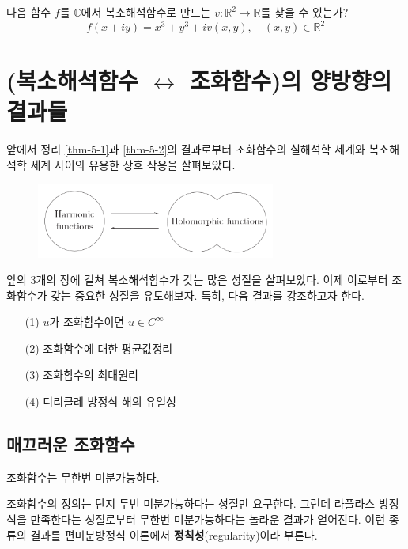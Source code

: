 \begin{salt_exercise}\label{ex-5-6}
다음 함수 $f$를 $\mathbb C$에서 복소해석함수로 만드는 $v:\mathbb R^2 \to \mathbb R$를
찾을 수 있는가? 
\[
f (x+iy)= x^3+y^3 + iv(x,y),\quad (x,y)\in \mathbb R^2
\]
\end{salt_exercise}

\section{(복소해석함수 $\leftrightarrow$ 조화함수)의 양방향의 결과들}

앞에서 정리 \ref{thm-5-1}과 \ref{thm-5-2}의 결과로부터 조화함수의 실해석학 세계와
복소해석학 세계 사이의 유용한 상호 작용을 살펴보았다.

\begin{figure}[h!]
\begin{center}
\includegraphics[width=0.7\textwidth]{./SaltChapter/figs/fig-5-0-1}
\end{center}
\end{figure}

앞의 3개의 장에 걸쳐 복소해석함수가 갖는 많은 성질을 살펴보았다.
이제 이로부터 조화함수가 갖는 중요한 성질을 유도해보자.
특히, 다음 결과를 강조하고자 한다.
\begin{itemize}
\item[(1)] $u$가 조화함수이면 $u\in C^\infty$
\item[(2)] 조화함수에 대한 평균값정리
\item[(3)] 조화함수의 최대원리
\item[(4)] 디리클레 방정식 해의 유일성
\end{itemize}

\subsection{매끄러운 조화함수}

\begin{salt_corollary}\label{coro-5-1}
조화함수는 무한번 미분가능하다.
\end{salt_corollary}

조화함수의 정의는 단지 두번 미분가능하다는 성질만 요구한다.
그런데 라플라스 방정식을 만족한다는 성질로부터 무한번 미분가능하다는 놀라운 결과가 얻어진다.
이런 종류의 결과를 편미분방정식 이론에서 \textbf{정칙성}(regularity)이라 부른다.

